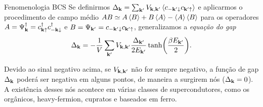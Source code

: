 \documentclass[a4paper,10pt]{article}
\begin{document}
\begin{section}{Fenomenologia BCS}
Se definirmos $\Delta_{\k} = \sum_{\k'} V_{\k,\k'} \ev{c_{-\k'\down} c_{\k'\up}}$ e aplicarmos o procedimento de campo médio $AB \simeq A\ev{B} + B\ev{A} - \ev{A}\ev{B}$ para os operadores $A = \Psi_{\vb{k}}^\dagger = c_{\vb{k}\uparrow}^\dagger c_{-\vb{k}\downarrow}^\dagger$ e $B = \Psi_{\vb{k}'} = c_{-\vb{k}'\downarrow} c_{\vb{k}'\uparrow}$, generalizamos a \textit{equação do gap}
\begin{equation} \label{eq:gapeq}
\Delta_{\vb{k}} = - \frac{1}{V} \sum_{\vb{k}'} V_{\vb{k},\vb{k}'} \frac{\Delta_{\vb{k}'}}{2 E_{\vb{k}'}} \tanh(\frac{\beta E_{\vb{k}'}}{2}).
\end{equation}

Devido ao sinal negativo acima, se $V_{\vb{k},\vb{k}'}$ não for sempre negativo, a função de gap $\Delta_{\vb{k}}$ poderá ser negativa em alguns pontos, de maneira a surgirem nós ($\Delta_{\vb{k}} = 0$). A existência desses nós acontece em várias classes de supercondutores, como os orgânicos, heavy-fermion, cupratos e baseados em ferro.

\end{section}
\end{document}
